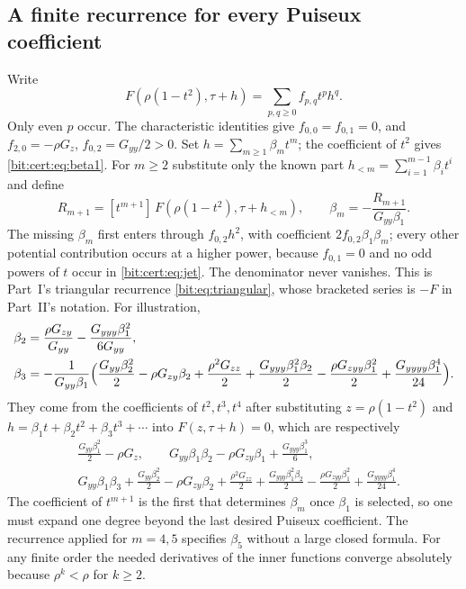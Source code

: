 \documentclass[11pt]{article}
\theoremstyle{definition}\newtheorem{definition}[theorem]{Definition}
\theoremstyle{remark}\newtheorem{remark}[theorem]{Remark}
\begin{document}
\subsection{A finite recurrence for every Puiseux coefficient}
Write
\begin{equation}\label{bit:cert:eq:jet}
 F(\rho(1-t^2),\tau+h)=\sum_{p,q\ge0}f_{p,q}t^ph^q.
\end{equation}
Only even $p$ occur. The characteristic identities give $f_{0,0}=f_{0,1}=0$,
and $f_{2,0}=-\rho G_z$, $f_{0,2}=G_{yy}/2>0$. Set $h=\sum_{m\ge1}\beta_mt^m$;
the coefficient of $t^2$ gives \eqref{bit:cert:eq:beta1}. For $m\ge2$
substitute only the known part $h_{<m}=\sum_{i=1}^{m-1}\beta_it^i$ and define
\begin{equation}\label{bit:cert:eq:betarec}
 R_{m+1}=[t^{m+1}]\,F(\rho(1-t^2),\tau+h_{<m}),\qquad
 \beta_m=-\frac{R_{m+1}}{G_{yy}\beta_1}.
\end{equation}
The missing $\beta_m$ first enters through $f_{0,2}h^2$, with coefficient
$2f_{0,2}\beta_1\beta_m$; every other potential contribution occurs at a
higher power, because $f_{0,1}=0$ and no odd powers of $t$ occur in
\eqref{bit:cert:eq:jet}. The denominator never vanishes. This is Part~I's
triangular recurrence \eqref{bit:eq:triangular}, whose bracketed series is
$-F$ in Part~II's notation.
For illustration,
\begin{align}
 \beta_2&=\frac{\rho G_{zy}}{G_{yy}}
              -\frac{G_{yyy}\beta_1^2}{6G_{yy}},\label{bit:cert:eq:beta2}\\*
 \beta_3&=-\frac1{G_{yy}\beta_1}\Bigl(
  \frac{G_{yy}\beta_2^2}{2}-\rho G_{zy}\beta_2
  +\frac{\rho^2G_{zz}}2+\frac{G_{yyy}\beta_1^2\beta_2}2
  -\frac{\rho G_{zyy}\beta_1^2}2
  +\frac{G_{yyyy}\beta_1^4}{24}\Bigr).\label{bit:cert:eq:beta3}
\end{align}
They come from the coefficients of $t^2,t^3,t^4$ after substituting
$z=\rho(1-t^2)$ and $h=\beta_1t+\beta_2t^2+\beta_3t^3+\cdots$ into
$F(z,\tau+h)=0$, which are respectively
\begin{align*}
 &\frac{G_{yy}\beta_1^2}2-\rho G_z,\qquad
 G_{yy}\beta_1\beta_2-\rho G_{zy}\beta_1+\frac{G_{yyy}\beta_1^3}6,\\
 &G_{yy}\beta_1\beta_3+\frac{G_{yy}\beta_2^2}2
       -\rho G_{zy}\beta_2+\frac{\rho^2G_{zz}}2
       +\frac{G_{yyy}\beta_1^2\beta_2}2
       -\frac{\rho G_{zyy}\beta_1^2}2
       +\frac{G_{yyyy}\beta_1^4}{24}.
\end{align*}
The coefficient of $t^{m+1}$ is the first that determines $\beta_m$ once
$\beta_1$ is selected, so one must expand one degree beyond the last desired
Puiseux coefficient. The recurrence applied for $m=4,5$ specifies $\beta_5$
without a large closed formula. For any finite order the needed derivatives
of the inner functions converge absolutely because $\rho^k<\rho$ for $k\ge2$.
\end{document}
